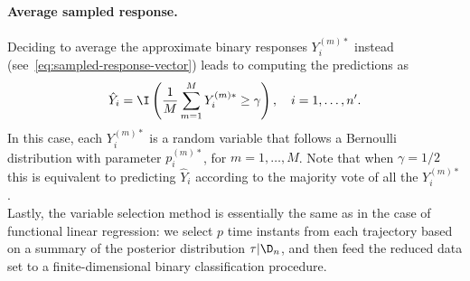  \paragraph{Average sampled response.} Deciding to average the approximate binary responses \(Y_i^{(m)*}\) instead (see~\eqref{eq:sampled-response-vector}) leads to computing the predictions as
  \[
    \hat Y_i = \I\left(\frac{1}{M} \sum_{m=1}^M Y_i^{(m)*} \geq \gamma\right), \quad i=1,\dots,n'.
  \]
  In this case, each \(Y_i^{(m)*}\) is a random variable that follows a Bernoulli distribution with parameter \(p_i^{(m)*}\), for \(m=1,\dots,M\). Note that when \(\gamma=1/2\) this is equivalent to predicting \(\hat Y_i\) according to the majority vote of all the \(Y_i^{(m)*}\).\\

Lastly, the variable selection method is essentially the same as in the case of functional linear regression: we select \(p\) time instants from each trajectory based on a summary of the posterior distribution \(\tau | \D_n\), and then feed the reduced data set to a finite-dimensional binary classification procedure.

